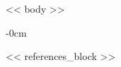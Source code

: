 \documentclass[journal,article,submit,pdftex,moreauthors]{Definitions/mdpi}
\begin{document}
<< body >>

\begin{adjustwidth}{-\extralength}{0cm}



% 


<< references_block >>





%



\end{adjustwidth}
\end{document}
